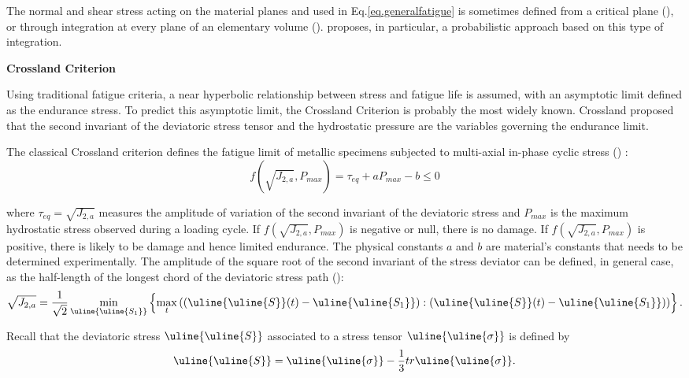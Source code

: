The normal and shear stress acting on the material planes and used in Eq.\eqref{eq.generalfatigue} is sometimes defined from a critical plane (\cite{findley1959behavior}), or
through integration at every plane of an elementary volume (\cite{liu1993berechnung}). \cite{thu2008effet} proposes, in
particular, a probabilistic approach based on this type of integration.

\textbf{Crossland Criterion}

 Using traditional fatigue criteria, a near hyperbolic relationship between stress and fatigue life is assumed, with an asymptotic limit defined as the endurance stress. To predict this asymptotic limit, the Crossland Criterion is probably the most widely known. Crossland proposed that the second invariant of the deviatoric stress tensor and the hydrostatic pressure are the variables governing the endurance limit. 

The classical Crossland criterion defines the fatigue limit of metallic specimens subjected to multi-axial in-phase cyclic stress (\cite{crossland1956effect}) : 
\begin{equation}f(\sqrt{J_{2,a}},P_{max})=\tau_{eq}+aP_{max}-b\leqslant 0\end{equation}

where $\tau_{eq}=\sqrt{J_{2,a}}$ measures  the amplitude of variation of the second invariant of the deviatoric stress  and $P_{max}$ is the maximum hydrostatic stress observed during a loading cycle. If $f(\sqrt{J_{2,a}},P_{max})$ is negative or null, there is no damage. If $f(\sqrt{J_{2,a}},P_{max})$ is positive, there is likely to be damage and hence limited endurance. The physical constants $a$ and $b$ are material's constants that needs to be determined experimentally. The amplitude of the square root of the second invariant of the stress deviator can be defined, in general case, as the half-length of the longest chord of the deviatoric stress path (\cite{Papadopoulos1997219}):
\begin{equation}\sqrt{J_{2,a}}=\frac{1}{\sqrt{2}}\min \limits_{\uline{\uline{S_1}}}\left\lbrace \max \limits_{t}\left( (\uline{\uline{S}}(t)-\uline{\uline{S_1}}):(\uline{\uline{S}}(t)-\uline{\uline{S_1}})\right)\right\rbrace .\end{equation}

Recall that the deviatoric stress $\uline{\uline{S}}$ associated to a stress tensor $\uline{\uline{\sigma}}$  is defined by
\begin{equation} \uline{\uline{S}}=\uline{\uline{\sigma}}-\frac{1}{3}tr\uline{\uline{\sigma}}.
\end{equation}

